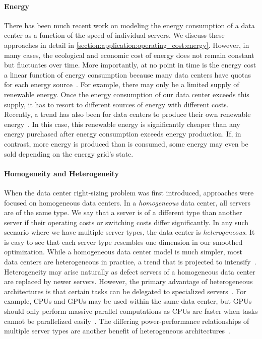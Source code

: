 \paragraph{Energy} There has been much recent work on modeling the energy consumption of a data center as a function of the speed of individual servers. We discuss these approaches in detail in \cref{section:application:operating_cost:energy}. However, in many cases, the ecological and economic cost of energy does not remain constant but fluctuates over time. More importantly, at no point in time is the energy cost a linear function of energy consumption because many data centers have quotas for each energy source~\cite{Miller2021}. For example, there may only be a limited supply of renewable energy. Once the energy consumption of our data center exceeds this supply, it has to resort to different sources of energy with different costs. Recently, a trend has also been for data centers to produce their own renewable energy~\cite{Lin2012}. In this case, this renewable energy is significantly cheaper than any energy purchased after energy consumption exceeds energy production. If, in contrast, more energy is produced than is consumed, some energy may even be sold depending on the energy grid's state.

\paragraph{Homogeneity and Heterogeneity} When the data center right-sizing problem was first introduced, approaches were focused on homogeneous data centers. In a \emph{homogeneous} data center, all servers are of the same type. We say that a server is of a different type than another server if their operating costs or switching costs differ significantly. In any such scenario where we have multiple server types, the data center is \emph{heterogeneous}. It is easy to see that each server type resembles one dimension in our smoothed optimization. While a homogeneous data center model is much simpler, most data centers are heterogeneous in practice, a trend that is projected to intensify~\cite{Jin2016}. Heterogeneity may arise naturally as defect servers of a homogeneous data center are replaced by newer servers. However, the primary advantage of heterogeneous architectures is that certain tasks can be delegated to specialized servers~\cite{Jin2016}. For example, CPUs and GPUs may be used within the same data center, but GPUs should only perform massive parallel computations as CPUs are faster when tasks cannot be parallelized easily~\cite{Shan2006}. The differing power-performance relationships of multiple server types are another benefit of heterogeneous architectures~\cite{Jin2016}.

